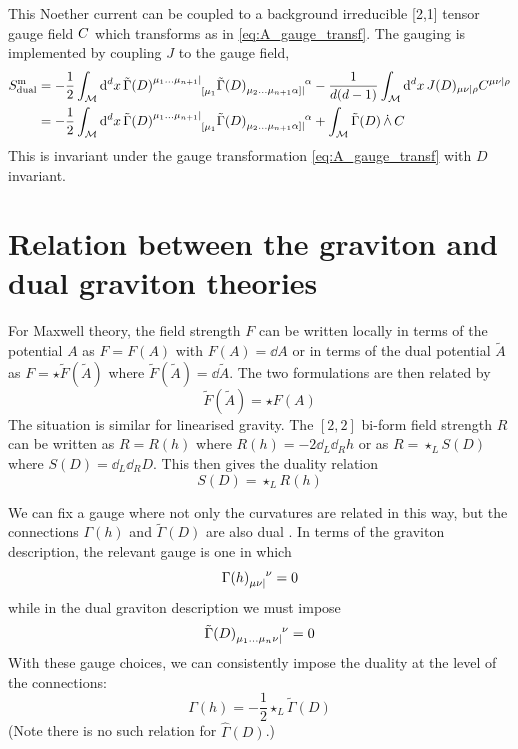 This Noether current can be coupled to a background irreducible [2,1] tensor gauge field $C$ which transforms as in \eqref{eq:A_gauge_transf}. The gauging is implemented by coupling $J$ to the gauge field,
\begin{align}
\begin{split}
    S_{\text{dual}}^{\text{m}} &= -\frac{1}{2} \int_{\mathcal{M}} \dd[d]{x} \tilde{\Gamma}(D)\indices{^{\mu_1\dots\mu_{n+1}|}_{[\mu_1}} \tilde{\Gamma}(D)\indices{_{\mu_2\dots\mu_{n+1}\alpha]|}^\alpha} - \frac{1}{d(d-1)} \int_{\mathcal{M}} \dd[d]{x} J(D)_{\mu\nu|\rho}\gaugefield^{\mu\nu|\rho} \\
    &= -\frac{1}{2} \int_{\mathcal{M}} \dd[d]{x} \tilde{\Gamma}(D)\indices{^{\mu_1\dots\mu_{n+1}|}_{[\mu_1}} \tilde{\Gamma}(D)\indices{_{\mu_2\dots\mu_{n+1}\alpha]|}^\alpha} + \int_{\mathcal{M}} \tilde{\Gamma}(D) \,\wedgedot\, \gaugefield
\end{split}
\end{align}
This is invariant under the gauge transformation \eqref{eq:A_gauge_transf} with $D$ invariant.

\section{Relation between the graviton and dual graviton theories}
\label{sec:relating_dual_theories}

For Maxwell theory, the field strength $F$ can be written locally in terms of the potential $A$ as $F=F(A)$ with $F(A)= \dd A$ or in terms of the dual potential $\tilde A$ as $F=\star \tilde F(\tilde A)$ where $\tilde F(\tilde A)= \dd\tilde A$. The two formulations are then related by
\begin{equation}
     \tilde F(\tilde A) = \star F(A)
\end{equation}
The situation is similar for linearised gravity. The $[2,2]$ bi-form field strength $R$ can be written as $R=R(h)$ where $R(h)=-2\dd_L \dd_R h$ or as $R=\star_L S(D)$ where $S(D)=\dd_L \dd_R D$. This then gives the duality relation \cite{Hull2001DualityFields}
\begin{equation}
    S(D) = \star_L R(h)
\end{equation}

We can fix a gauge where not only the curvatures are related in this way, but the connections $\Gamma(h)$ and $\tilde{\Gamma}(D)$ are also dual \cite{HullYetAppear}. In terms of the graviton description, the relevant gauge is one in which
\begin{equation}\label{eq:h_duality_gauge}
    \Gamma(h)\indices{_{\mu\nu|}^\nu} = 0
\end{equation}
while in the dual graviton description we must impose
\begin{equation}\label{eq:D_duality_gauge}
    \tilde{\Gamma}(D)\indices{_{\mu_1\dots\mu_n\nu|}^\nu} = 0
\end{equation}
With these gauge choices, we can consistently impose the duality at the level of the connections:
\begin{equation}\label{eq:connection_duality}
    \Gamma(h) = -\frac{1}{2}\star_L \tilde{\Gamma}(D)
\end{equation}
(Note there is no such relation for $\hat{\Gamma}(D)$.)

